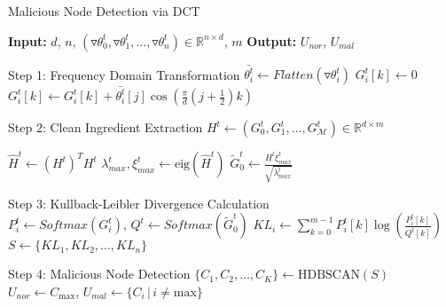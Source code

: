 \documentclass[lettersize,journal]{IEEEtran}
\begin{document}
\begin{algorithm}
\caption{Malicious Node Detection via DCT}
\label{alg:malicious-node-detection}
\begin{algorithmic}[1]
\State \textbf{Input:} $d$, $n$, $(\triangledown \theta_0^t, \triangledown \theta_1^t, \ldots, \triangledown \theta_n^t) \in \mathbb{R}^{n \times d}$, $m$ 
\State \textbf{Output:} $U_{nor}$, $U_{mal}$ 

\State Step 1: Frequency Domain Transformation
    \State $\bar{\theta_i^t} \gets Flatten(\triangledown \theta_i^t)$
        \State $G_i^t[k] \gets 0$
            \State $G_i^t[k] \gets G_i^t[k] + \bar{\theta_i^t}[j] \cos \left( \frac{\pi}{d} \left(j + \frac{1}{2}\right) k \right)$
        \EndFor
    \EndFor
\EndFor

\State

\State Step 2: Clean Ingredient Extraction
\State $H^t \gets (G_0^t, G_1^t, \ldots, G_{\mathcal{M}}^t) \in \mathbb{R}^{d \times m}$ 

\State $\hat{H}^t \gets (H^t)^{T} H^t$
\State $\lambda_{max}^t, \xi_{max}^t \gets \text{eig}(\hat{H}^t)$ 
\State $\tilde{G}^t_0 \gets \frac{H^t \xi_{max}^t}{\sqrt{\lambda_{max}^t}}$ 

\State

\State Step 3: Kullback-Leibler Divergence Calculation
\State $P_i^t \gets Softmax(G_i^t), \, Q^t \gets Softmax(\tilde{G}^t_0)$
    \State $KL_i \gets \sum_{k=0}^{m-1} P_i^t[k] \log \left( \frac{P_i^t[k]}{Q^t[k]} \right)$
\EndFor
\State $S \gets \{KL_1, KL_2, \ldots, KL_n\}$ 

\State

\State Step 4: Malicious Node Detection
\State $\{C_1, C_2, \ldots, C_K\} \gets \text{HDBSCAN}(S)$
\State $U_{nor} \gets C_{\text{max}}$, $U_{mal} \gets \{C_i \, | \, i \neq \text{max}\}$

\end{algorithmic}
\end{algorithm}
\end{document}
